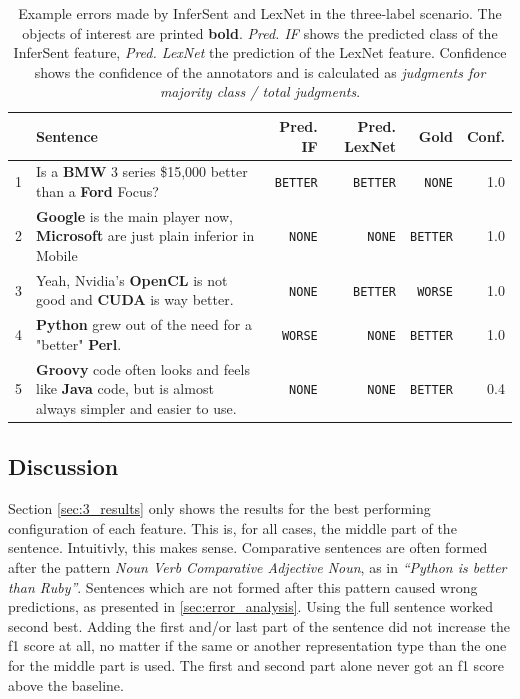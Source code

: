 \begin{table}[htbp]
\caption{Example errors made by InferSent and LexNet in the three-label scenario. The objects of interest are printed \textbf{bold}. \emph{Pred. IF} shows the predicted class of the InferSent feature, \emph{Pred. LexNet} the prediction of the LexNet feature. Confidence shows the confidence of the annotators and is calculated as \emph{judgments for majority class / total judgments}.}
\label{tbl:3_mistakes_both}
\begin{tabularx}{\linewidth}{lXrrrr}
\toprule
 & Sentence & Pred. IF & Pred. LexNet & Gold & Conf. \\ \midrule
1 & Is a \textbf{BMW} 3 series \$15,000 better than a \textbf{Ford} Focus? & \texttt{BETTER} & \texttt{BETTER} & \texttt{NONE} & 1.0\\ %

2 & \textbf{Google} is the main player now, \textbf{Microsoft} are just plain inferior in Mobile & \texttt{NONE} & \texttt{NONE} & \texttt{BETTER} & 1.0\\ %

3 & Yeah, Nvidia's \textbf{OpenCL} is not good and \textbf{CUDA} is way better. & \texttt{NONE} & \texttt{BETTER} & \texttt{WORSE} & 1.0\\ %

4 & \textbf{Python} grew out of the need for a "better" \textbf{Perl}. & \texttt{WORSE} & \texttt{NONE} & \texttt{BETTER} & 1.0\\

5 & \textbf{Groovy} code often looks and feels like \textbf{Java} code, but is almost always simpler and easier to use. & \texttt{NONE} & \texttt{NONE} & \texttt{BETTER} & 0.4\\ %

 \bottomrule
\end{tabularx}
\end{table}

\FloatBarrier
\subsection{Discussion}
Section \ref{sec:3_results} only shows the results for the best performing configuration of each feature. This is, for all cases, the middle part of the sentence. Intuitivly, this makes sense. Comparative sentences are often formed after the pattern \emph{Noun Verb Comparative Adjective Noun}, as in \emph{\enquote{Python is better than Ruby}}. Sentences which are not formed after this pattern caused wrong predictions, as presented in \ref{sec:error_analysis}.
 Using the full sentence worked second best. Adding the first and/or last part of the sentence did not increase the f1 score at all, no matter if the same or another representation type than the one for the middle part is used. The first and second part alone never got an f1 score above the baseline.

